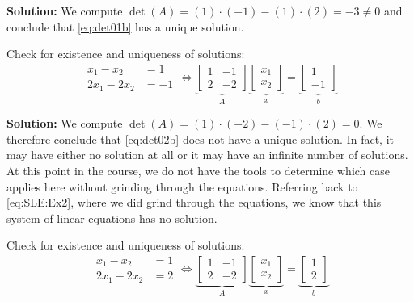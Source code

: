 \textbf{Solution:}
We compute $\det(A) = (1)\cdot(-1)-(1)\cdot(2) = -3 \neq 0$ and conclude that \eqref{eq:det01b} has a unique solution.
\Qed\\
 


\begin{example}
\label{ex:Det02} 
Check for existence and uniqueness of solutions:
\begin{equation}
\label{eq:det02b}
\begin{aligned}
x_1-x_2 &=1 \\
2x_1-2x_2&=-1
\end{aligned} \iff \underbrace{\left[\begin{array}{rr} 1 & -1\\
2 & -2 \end{array}\right]}_{A} \underbrace{\left[\begin{array}{c} x_1\\
x_2\end{array}\right]}_{x} =   \underbrace{\left[\begin{array}{r} 1\\
-1\end{array}\right]}_{b}
\end{equation}
\end{example}

\textbf{Solution:}
We compute $\det(A) = (1)\cdot(-2)-(-1)\cdot(2) = 0$. We therefore conclude that \eqref{eq:det02b} does not have a unique solution. In fact, it may have either no solution at all or it may have an infinite number of solutions. At this point in the course, we do not have the tools to determine which case applies here without grinding through the equations. Referring back to \eqref{eq:SLE:Ex2}, where we did grind through the equations, we know that this system of linear equations has no solution.
\Qed

\begin{example}
\label{ex:Det03} 
Check for existence and uniqueness of solutions:
\begin{equation}
\label{eq:det03b}
\begin{aligned}
x_1-x_2 &=1 \\
2x_1-2x_2&=2
\end{aligned} \iff \underbrace{\left[\begin{array}{rr} 1 & -1\\
2 & -2 \end{array}\right]}_{A} \underbrace{\left[\begin{array}{c} x_1\\
x_2\end{array}\right]}_{x} =   \underbrace{\left[\begin{array}{r} 1\\
2\end{array}\right]}_{b}
\end{equation}


\end{example}

